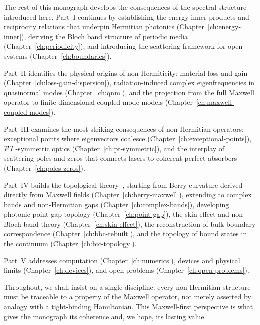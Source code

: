 The rest of this monograph develops the consequences of the spectral
structure introduced here. Part~I continues by establishing the energy
inner products and reciprocity relations that underpin Hermitian photonics
(Chapter~\ref{ch:energy-inner}), deriving the Bloch band structure of
periodic media (Chapter~\ref{ch:periodicity}), and introducing the
scattering framework for open systems (Chapter~\ref{ch:boundaries}).

Part~II identifies the physical origins of non-Hermiticity:
material loss and gain (Chapter~\ref{ch:loss-gain-dispersion}),
radiation-induced complex eigenfrequencies in quasinormal modes
(Chapter~\ref{ch:qnm}), and the projection from the full Maxwell
operator to finite-dimensional coupled-mode models
(Chapter~\ref{ch:maxwell-coupled-modes}).

Part~III examines the most striking consequences of non-Hermitian operators:
exceptional points where eigenvectors coalesce
(Chapter~\ref{ch:exceptional-points}), $\mathcal{PT}$-symmetric optics
(Chapter~\ref{ch:pt-symmetric}), and the interplay of scattering poles
and zeros that connects lasers to coherent perfect absorbers
(Chapter~\ref{ch:poles-zeros}).

Part~IV builds the topological theory~\cite{icon2019rev,haldane2008possible}, starting from Berry curvature
derived directly from Maxwell fields (Chapter~\ref{ch:berry-maxwell}),
extending to complex bands and non-Hermitian gaps
(Chapter~\ref{ch:complex-bands}), developing photonic point-gap topology
(Chapter~\ref{ch:point-gap}), the skin effect and non-Bloch band theory
(Chapter~\ref{ch:skin-effect}), the reconstruction of bulk-boundary
correspondence (Chapter~\ref{ch:bbc-rebuilt}), and the topology of
bound states in the continuum (Chapter~\ref{ch:bic-topology}).

Part~V addresses computation (Chapter~\ref{ch:numerics}), devices and
physical limits (Chapter~\ref{ch:devices}), and open problems
(Chapter~\ref{ch:open-problems}).

Throughout, we shall insist on a single discipline: every non-Hermitian
structure must be traceable to a property of the Maxwell operator, not
merely asserted by analogy with a tight-binding Hamiltonian. This
Maxwell-first perspective is what gives the monograph its coherence and,
we hope, its lasting value.
